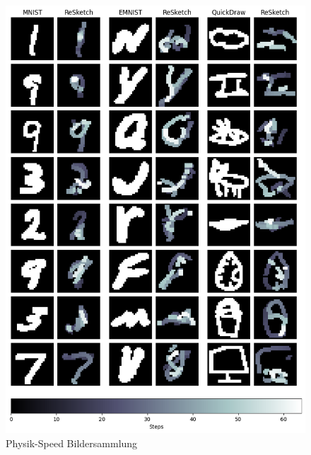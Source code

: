 \begin{figure}[!ht]
    \centering
    \includegraphics[width=\textwidth]{images/resultate/physics-speed.png}
    \caption{Physik-Speed Bildersammlung}
    \label{fig:Physik-Speed}
\end{figure}

